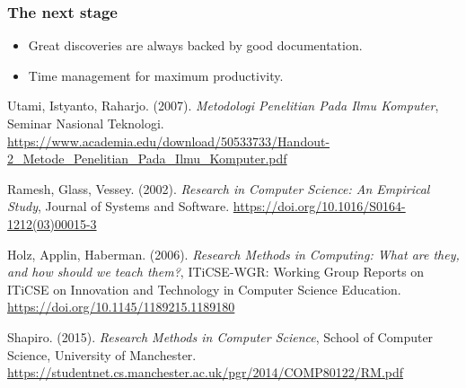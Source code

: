 \documentclass[a4paper,12pt]{article}
\begin{document}
            \subsubsection{The next stage}
                \begin{itemize}
                    \item Great discoveries are always backed by good documentation.
                    \item Time management for maximum productivity.
                \end{itemize}

    \begin{thebibliography}{100}
         Utami, Istyanto, Raharjo. (2007). \emph{Metodologi Penelitian Pada Ilmu Komputer}, Seminar Nasional Teknologi. \url{https://www.academia.edu/download/50533733/Handout-2_Metode_Penelitian_Pada_Ilmu_Komputer.pdf}

         Ramesh, Glass, Vessey. (2002). \emph{Research in Computer Science: An Empirical Study}, Journal of Systems and Software. \url{https://doi.org/10.1016/S0164-1212(03)00015-3}

         Holz, Applin, Haberman. (2006). \emph{Research Methods in Computing: What are they, and how should we teach them?}, ITiCSE-WGR: Working Group Reports on ITiCSE on Innovation and Technology in Computer Science Education. \url{https://doi.org/10.1145/1189215.1189180}
        
         Shapiro. (2015). \emph{Research Methods in Computer Science}, School of Computer Science, University of Manchester. \url{https://studentnet.cs.manchester.ac.uk/pgr/2014/COMP80122/RM.pdf}
    \end{thebibliography}
\end{document}
